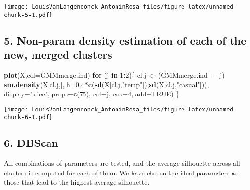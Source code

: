 \documentclass[
]{article}
\newenvironment{Shaded}{\begin{snugshade}}{\end{snugshade}}
\newcommand{\AttributeTok}[1]{\textcolor[rgb]{0.13,0.29,0.53}{#1}}
\newcommand{\ConstantTok}[1]{\textcolor[rgb]{0.56,0.35,0.01}{#1}}
\newcommand{\ControlFlowTok}[1]{\textcolor[rgb]{0.13,0.29,0.53}{\textbf{#1}}}
\newcommand{\DecValTok}[1]{\textcolor[rgb]{0.00,0.00,0.81}{#1}}
\newcommand{\FloatTok}[1]{\textcolor[rgb]{0.00,0.00,0.81}{#1}}
\newcommand{\FunctionTok}[1]{\textcolor[rgb]{0.13,0.29,0.53}{\textbf{#1}}}
\newcommand{\NormalTok}[1]{#1}
\newcommand{\OtherTok}[1]{\textcolor[rgb]{0.56,0.35,0.01}{#1}}
\newcommand{\SpecialCharTok}[1]{\textcolor[rgb]{0.81,0.36,0.00}{\textbf{#1}}}
\newcommand{\StringTok}[1]{\textcolor[rgb]{0.31,0.60,0.02}{#1}}
\begin{document}
\texttt{[image: LouisVanLangendonck\_AntoninRosa\_files/figure-latex/unnamed-chunk-5-1.pdf]}

\hypertarget{non-param-density-estimation-of-each-of-the-new-merged-clusters}{%
\subsection{5. Non-param density estimation of each of the new, merged
clusters}\label{non-param-density-estimation-of-each-of-the-new-merged-clusters}}

\begin{Shaded}
\begin{Highlighting}[]
\FunctionTok{plot}\NormalTok{(X,}\AttributeTok{col=}\NormalTok{GMMmerge.ind)}
\ControlFlowTok{for}\NormalTok{ (j }\ControlFlowTok{in} \DecValTok{1}\SpecialCharTok{:}\DecValTok{2}\NormalTok{)\{}
\NormalTok{  cl.j }\OtherTok{\textless{}{-}}\NormalTok{ (GMMmerge.ind}\SpecialCharTok{==}\NormalTok{j)}
  \FunctionTok{sm.density}\NormalTok{(X[cl.j,],}
             \AttributeTok{h=}\FloatTok{0.4}\SpecialCharTok{*}\FunctionTok{c}\NormalTok{(}\FunctionTok{sd}\NormalTok{(X[cl.j,}\StringTok{"temp"}\NormalTok{]),}\FunctionTok{sd}\NormalTok{(X[cl.j,}\StringTok{"casual"}\NormalTok{])),}
             \AttributeTok{display=}\StringTok{"slice"}\NormalTok{,}
             \AttributeTok{props=}\FunctionTok{c}\NormalTok{(}\DecValTok{75}\NormalTok{),}
             \AttributeTok{col=}\NormalTok{j, }
             \AttributeTok{cex=}\DecValTok{4}\NormalTok{, }
             \AttributeTok{add=}\ConstantTok{TRUE}\NormalTok{)}
\NormalTok{\}}
\end{Highlighting}
\end{Shaded}

\texttt{[image: LouisVanLangendonck\_AntoninRosa\_files/figure-latex/unnamed-chunk-6-1.pdf]}

\hypertarget{dbscan}{%
\subsection{6. DBScan}\label{dbscan}}

All combinations of parameters are tested, and the average silhouette
across all clusters is computed for each of them. We have chosen the
ideal parameters as those that lead to the highest average silhouette.
\end{document}

